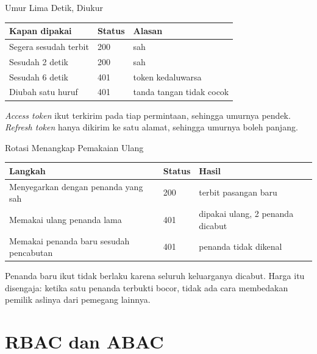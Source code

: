 \documentclass[aspectratio=169, table, 12pt]{beamer}
\begin{document}
\begin{frame}{{\Large Umur Lima Detik, Diukur}}
  \vspace{6pt}
  \centering
  {\footnotesize
  \begin{tabularx}{\textwidth}{Yll}
    \hline
    \textbf{Kapan dipakai} & \textbf{Status} & \textbf{Alasan} \\
    \hline
    Segera sesudah terbit & 200 & sah \\
    \hline
    Sesudah 2 detik & 200 & sah \\
    \hline
    Sesudah 6 detik & 401 & token kedaluwarsa \\
    \hline
    Diubah satu huruf & 401 & tanda tangan tidak cocok \\
    \hline
  \end{tabularx}}

  \vspace{8pt}
  {\small \textit{Access token} ikut terkirim pada tiap permintaan, sehingga
  umurnya pendek. \textit{Refresh token} hanya dikirim ke satu alamat,
  sehingga umurnya boleh panjang.}
\end{frame}

\begin{frame}{{\Large Rotasi Menangkap Pemakaian Ulang}}
  \vspace{6pt}
  \centering
  {\footnotesize
  \begin{tabularx}{\textwidth}{Yll}
    \hline
    \textbf{Langkah} & \textbf{Status} & \textbf{Hasil} \\
    \hline
    Menyegarkan dengan penanda yang sah & 200 & terbit pasangan baru \\
    \hline
    Memakai ulang penanda lama & 401 & dipakai ulang, 2 penanda dicabut \\
    \hline
    Memakai penanda baru sesudah pencabutan & 401 & penanda tidak dikenal \\
    \hline
  \end{tabularx}}

  \vspace{8pt}
  {\small Penanda baru ikut tidak berlaku karena seluruh keluarganya dicabut. Harga
  itu disengaja: ketika satu penanda terbukti bocor, tidak ada cara
  membedakan pemilik aslinya dari pemegang lainnya.}
\end{frame}

\section{RBAC dan ABAC}
\end{document}
